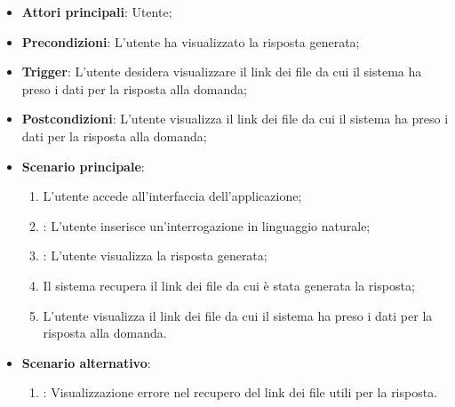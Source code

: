 \begin{itemize}
    \item \textbf{Attori principali}: Utente;
    \item \textbf{Precondizioni}: L'utente ha visualizzato la risposta generata;
    \item \textbf{Trigger}: L'utente desidera visualizzare il link dei file da cui il sistema ha preso i dati per la risposta alla domanda;
    \item \textbf{Postcondizioni}: L'utente visualizza il link dei file da cui il sistema ha preso i dati per la risposta alla domanda;
    \item \textbf{Scenario principale}:
    \begin{enumerate}
        \item L'utente accede all'interfaccia dell'applicazione;
        \item {}: L'utente inserisce un'interrogazione in linguaggio naturale;
        \item {}: L'utente visualizza la risposta generata;
        \item Il sistema recupera il link dei file da cui è stata generata la risposta;
        \item L'utente visualizza il link dei file da cui il sistema ha preso i dati per la risposta alla domanda.
    \end{enumerate}
    \item \textbf{Scenario alternativo}:
    \begin{enumerate}
        \item {}: Visualizzazione errore nel recupero del link dei file utili per la risposta.
    \end{enumerate}
\end{itemize}

\hypertarget{UC14}{}
